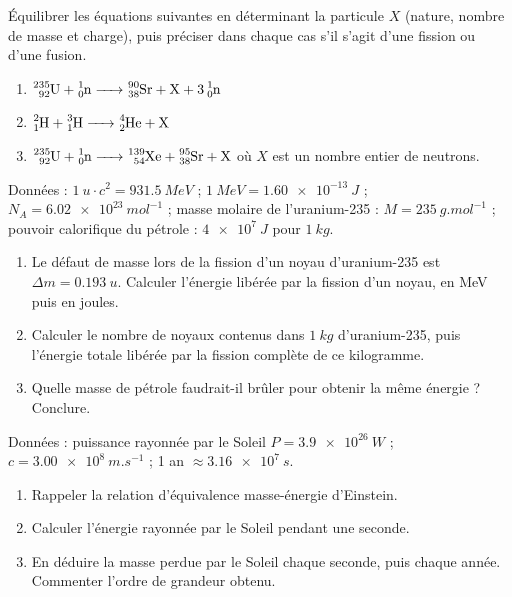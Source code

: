 \documentclass[11pt]{article}
\newcounter{popsec}
\newcounter{popsub}
\newcommand{\courssub}[1]{%
  \stepcounter{popsub}%
  \par\vspace{9pt}\noindent{\popxbold\fontsize{11.5}{13}\selectfont\color{popink}{\color{poporange}\thepopsec.\thepopsub}\hspace{6pt}#1}\par\nopagebreak\vspace{4pt}
}
\begin{document}
\courssub{Je m'entraîne}

\begin{exercice}
Équilibrer les équations suivantes en déterminant la particule $X$ (nature, nombre de masse et charge), puis préciser dans chaque cas s'il s'agit d'une fission ou d'une fusion.
\begin{enumerate}
\item $\ce{^{235}_{92}U + ^{1}_{0}n -> ^{90}_{38}Sr + X + 3^{1}_{0}n}$
\item $\ce{^{2}_{1}H + ^{3}_{1}H -> ^{4}_{2}He + X}$
\item $\ce{^{235}_{92}U + ^{1}_{0}n -> ^{139}_{54}Xe + ^{95}_{38}Sr + X}$ où $X$ est un nombre entier de neutrons.
\end{enumerate}
\end{exercice}

\begin{exercice}
Données : $\SI{1}{u} \cdot c^2 = \SI{931,5}{MeV}$ ; $\SI{1}{MeV} = \SI{1,60e-13}{J}$ ; $N_A = \SI{6,02e23}{mol^{-1}}$ ; masse molaire de l'uranium-235 : $M = \SI{235}{g.mol^{-1}}$ ; pouvoir calorifique du pétrole : $\SI{4e7}{J}$ pour $\SI{1}{kg}$.
\begin{enumerate}
\item Le défaut de masse lors de la fission d'un noyau d'uranium-235 est $\Delta m = \SI{0,193}{u}$. Calculer l'énergie libérée par la fission d'un noyau, en MeV puis en joules.
\item Calculer le nombre de noyaux contenus dans $\SI{1}{kg}$ d'uranium-235, puis l'énergie totale libérée par la fission complète de ce kilogramme.
\item Quelle masse de pétrole faudrait-il brûler pour obtenir la même énergie ? Conclure.
\end{enumerate}
\end{exercice}

\begin{exercice}
Données : puissance rayonnée par le Soleil $P = \SI{3,9e26}{W}$ ; $c = \SI{3,00e8}{m.s^{-1}}$ ; 1 an $\approx \SI{3,16e7}{s}$.
\begin{enumerate}
\item Rappeler la relation d'équivalence masse-énergie d'Einstein.
\item Calculer l'énergie rayonnée par le Soleil pendant une seconde.
\item En déduire la masse perdue par le Soleil chaque seconde, puis chaque année. Commenter l'ordre de grandeur obtenu.
\end{enumerate}
\end{exercice}
\end{document}
